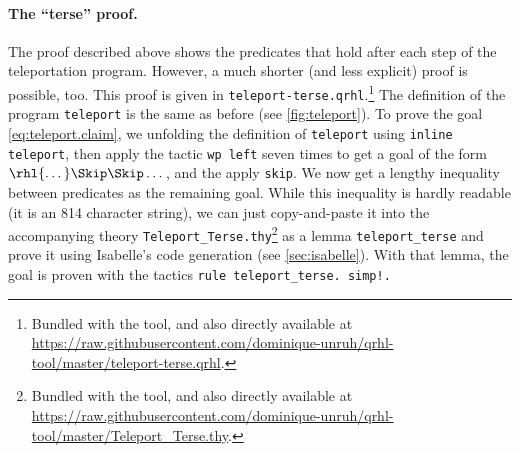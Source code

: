 \documentclass{article}
\newcommand\giturl[1]{\url{https://raw.githubusercontent.com/dominique-unruh/qrhl-tool/master/#1}}
\begin{document}
\paragraph{The ``terse'' proof.}
The proof described above shows the predicates that hold after each
step of the teleportation program. However, a much shorter (and less
explicit) proof is possible, too. This proof is given in
\texttt{teleport-terse.qrhl}.\footnote{Bundled with the tool, and also
  directly available at \giturl{teleport-terse.qrhl}.}  The definition of the
program \texttt{teleport} is the same as before (see
\autoref{fig:teleport}). To prove the goal \eqref{eq:teleport.claim},
we unfolding the definition of \texttt{teleport} using \texttt{inline
  teleport}, then apply the tactic \texttt{wp left} seven times to get
a goal of the form $\rhl{\dots}\Skip\Skip\dots$,
and the apply \texttt{skip}. We now get a lengthy inequality between
predicates as the remaining goal. While this inequality is hardly
readable (it is an 814 character string), we can just copy-and-paste
it into the accompanying theory
\texttt{Teleport\_Terse.thy}\footnote{Bundled with the tool, and also
  directly available at \giturl{Teleport\_Terse.thy}.} as a lemma
\texttt{teleport\_terse} and prove it using Isabelle's code generation
(see \autoref{sec:isabelle}). With that lemma, the goal is proven
with the tactics \texttt{\frenchspacing rule teleport\_terse. simp!.}


\printbibliography

\renewcommand\symbolindexentry[4]{\noindent\hbox{\hbox to 2in{$#2$\hfill}\parbox[t]{3.5in}{#3}\hbox to 1cm{\hfill #4}}\\[2pt]}

\printsymbolindex

\printindex  
\end{document}
